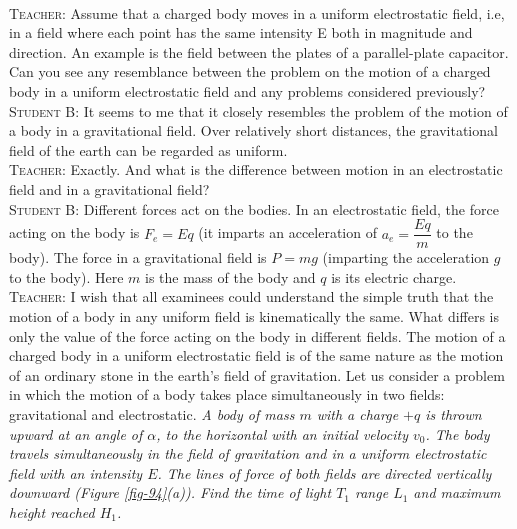 \documentclass[a4paper,sfsidenotes]{tufte-book}
\begin{document}
\paragraph{}
\textsc{Teacher:} Assume that a charged body moves in a uniform electrostatic field, i.e, in a field where
each point has the same intensity E both in magnitude and direction. An example is the field between the plates of a parallel-plate capacitor. Can you see any resemblance between the problem on the motion of a charged body in a uniform electrostatic field and any problems considered previously?
\\
\textsc{Student B:} It seems to me that it closely resembles the problem of the motion of a body in a gravitational field. Over relatively short distances, the gravitational field of the earth can be regarded as uniform.
\\
\textsc{Teacher:} Exactly. And what is the difference between motion in an electrostatic field and in a gravitational field?
\\
\textsc{Student B:} Different forces act on the bodies. In an electrostatic field, the force acting on the body is $F_{e}=Eq$ (it imparts an acceleration of $a_{e}=\dfrac{Eq}{m}$ to the body). The force in a gravitational field is $P=mg$ (imparting the acceleration $g$ to the body). Here $m$ is the mass of the body and $q$ is its electric charge.
\\
\textsc{Teacher:} I wish that all examinees could understand the simple truth that the motion of a body in any uniform field is kinematically the same. What differs is only the value of the force acting on the body in different fields. The motion of a charged body in a uniform electrostatic field is of the same nature as the motion of an ordinary stone in the earth's field of gravitation. Let us consider a problem in which the motion of a body takes place simultaneously in two fields: gravitational and electrostatic. \emph{A body of mass $m$ with a charge $+q$ is thrown upward at an angle of $\alpha$, to the horizontal with an initial velocity $v_{0}$. The body travels simultaneously in the field of gravitation and in a uniform electrostatic field with an intensity $E$. The lines of force of both fields are directed vertically downward (\emph{Figure \ref{fig-94}(a)}). Find the time of light $T_{1}$ range $L_{1}$ and maximum height reached $H_{1}$.}
\end{document}
